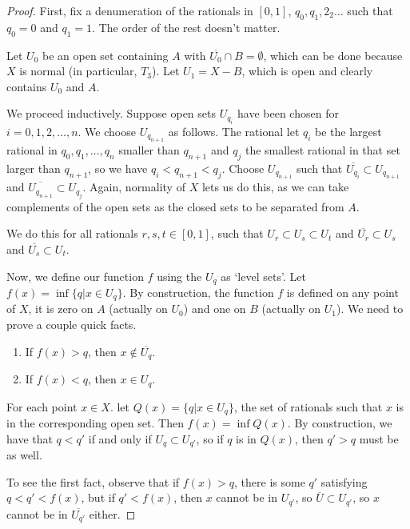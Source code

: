 

\begin{proof}


First, fix a denumeration of the rationals in $[0,1]$, $q_0,q_1,2_2\dots$ such that $q_0=0$ and $q_1=1$.  The order of the rest doesn't matter.

Let $U_0$ be an open set containing $A$ with $\overline{U_0}\cap B = \emptyset$, which can be done because $X$ is normal (in particular, $T_3$).  Let $U_1 = X{-}B$, which is open and clearly contains $U_0$ and $A$.

We proceed inductively.  Suppose open sets $U_{q_i}$ have been chosen for $i=0,1,2,\dots,n$.  We choose $U_{q_{n+1}}$ as follows.  The rational let $q_i$ be the largest rational in $q_0,q_1,\dots,q_n$ smaller than $q_{n+1}$ and $q_j$ the smallest rational in that set larger than $q_{n+1}$, so we have $q_i<q_{n+1}<q_j$.  Choose $U_{q_{n+1}}$ such that $\overline{U_{q_i}}\subset U_{q_{n+1}}$ and $\overline{U_{q_{n+1}}}\subset U_{q_j}$.  Again, normality of $X$ lets us do this, as we can take complements of the open sets as the closed sets to be separated from $A$.

We do this for all rationals $r,s,t\in [0,1]$, such that $U_r\subset U_s \subset U_t$ and $\overline{U_r}\subset U_s$ and $\overline{U_s}\subset U_t$.

Now, we define our function $f$ using the $U_q$ as `level sets'.  Let $f(x) = \inf\{q|x\in U_q\}$.  By construction, the function $f$ is defined on any point of $X$, it is zero on $A$ (actually on $U_0$) and one on $B$ (actually on $U_1$).  We need to prove a couple quick facts.

\begin{enumerate}
	\item If $f(x)>q$, then $x\notin \overline{U_q}$.
	\item If $f(x)<q$, then $x\in U_q$.
\end{enumerate}

For each point $x\in X$. let $Q(x) = \{q|x\in U_q\}$, the set of rationals such that $x$ is in the corresponding open set.  Then $f(x) = \inf Q(x)$.  By construction, we have that $q<q'$ if and only if $U_q\subset U_{q'}$, so if $q$ is in $Q(x)$, then $q'>q$ must be as well.

To see the first fact, observe that if $f(x)>q$, there is some $q'$ satisfying $q<q'<f(x)$, but if $q'<f(x)$, then $x$ cannot be in $U_{q'}$, so $\overline{U}\subset U_{q'}$, so $x$ cannot be in $\overline{U_{q'}}$ either.


\end{proof}

